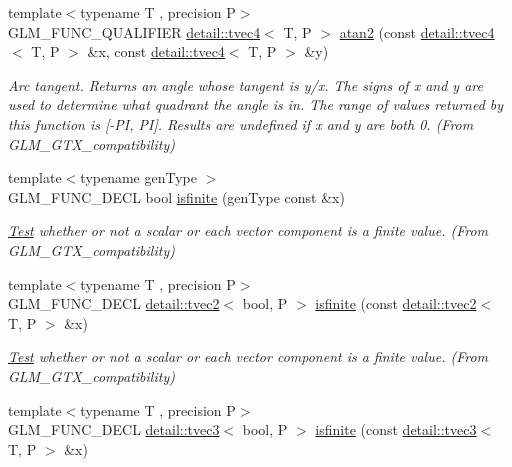 \begin{DoxyCompactItemize}
{\footnotesize template$<$typename T , precision P$>$ }\\G\+L\+M\+\_\+\+F\+U\+N\+C\+\_\+\+Q\+U\+A\+L\+I\+F\+I\+ER \hyperlink{structglm_1_1detail_1_1tvec4}{detail\+::tvec4}$<$ T, P $>$ \hyperlink{group__gtx__compatibility_ga3b9f0577d1b5d76c0f6ab04e28599fc4}{atan2} (const \hyperlink{structglm_1_1detail_1_1tvec4}{detail\+::tvec4}$<$ T, P $>$ \&x, const \hyperlink{structglm_1_1detail_1_1tvec4}{detail\+::tvec4}$<$ T, P $>$ \&y)
\begin{DoxyCompactList}\small\item\em Arc tangent. Returns an angle whose tangent is y/x. The signs of x and y are used to determine what quadrant the angle is in. The range of values returned by this function is \mbox{[}-\/\+PI, PI\mbox{]}. Results are undefined if x and y are both 0. (From G\+L\+M\+\_\+\+G\+T\+X\+\_\+compatibility) \end{DoxyCompactList}\item 
{\footnotesize template$<$typename gen\+Type $>$ }\\G\+L\+M\+\_\+\+F\+U\+N\+C\+\_\+\+D\+E\+CL bool \hyperlink{group__gtx__compatibility_gaf4b04dcd3526996d68c1bfe17bfc8657}{isfinite} (gen\+Type const \&x)
\begin{DoxyCompactList}\small\item\em \hyperlink{class_test}{Test} whether or not a scalar or each vector component is a finite value. (From G\+L\+M\+\_\+\+G\+T\+X\+\_\+compatibility) \end{DoxyCompactList}\item 
{\footnotesize template$<$typename T , precision P$>$ }\\G\+L\+M\+\_\+\+F\+U\+N\+C\+\_\+\+D\+E\+CL \hyperlink{structglm_1_1detail_1_1tvec2}{detail\+::tvec2}$<$ bool, P $>$ \hyperlink{group__gtx__compatibility_ga604f38239da3a5b5b1e4fe06dec7f64d}{isfinite} (const \hyperlink{structglm_1_1detail_1_1tvec2}{detail\+::tvec2}$<$ T, P $>$ \&x)
\begin{DoxyCompactList}\small\item\em \hyperlink{class_test}{Test} whether or not a scalar or each vector component is a finite value. (From G\+L\+M\+\_\+\+G\+T\+X\+\_\+compatibility) \end{DoxyCompactList}\item 
{\footnotesize template$<$typename T , precision P$>$ }\\G\+L\+M\+\_\+\+F\+U\+N\+C\+\_\+\+D\+E\+CL \hyperlink{structglm_1_1detail_1_1tvec3}{detail\+::tvec3}$<$ bool, P $>$ \hyperlink{group__gtx__compatibility_ga416b6078bffd22e3a56a5c5379ba2cf8}{isfinite} (const \hyperlink{structglm_1_1detail_1_1tvec3}{detail\+::tvec3}$<$ T, P $>$ \&x)

\end{DoxyCompactItemize}
